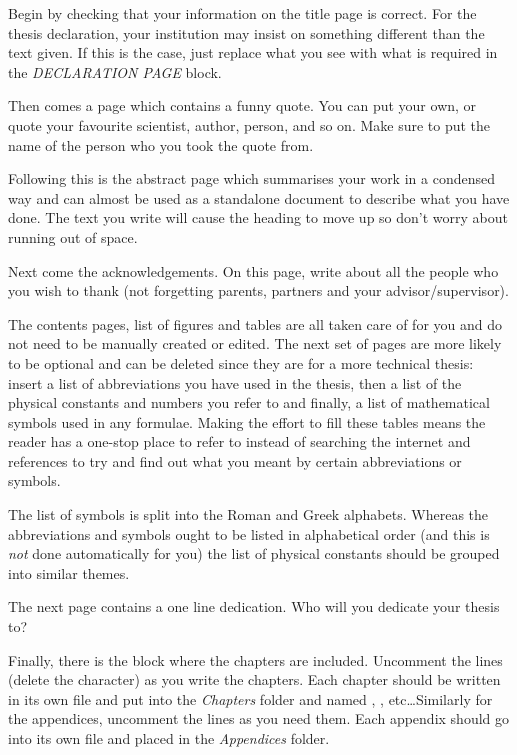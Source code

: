 Begin by checking that your information on the title page is correct. For the 
thesis declaration, your institution may insist on something different than the 
text given. If this is the case, just replace what you see with what is required 
in the \emph{DECLARATION PAGE} block.

Then comes a page which contains a funny quote. You can put your own, or quote 
your favourite scientist, author, person, and so on. Make sure to put the name 
of the person who you took the quote from.

Following this is the abstract page which summarises your work in a condensed 
way and can almost be used as a standalone document to describe what you have 
done. The text you write will cause the heading to move up so don't worry about 
running out of space.

Next come the acknowledgements. On this page, write about all the people who you 
wish to thank (not forgetting parents, partners and your advisor/supervisor).

The contents pages, list of figures and tables are all taken care of for you and 
do not need to be manually created or edited. The next set of pages are more 
likely to be optional and can be deleted since they are for a more technical 
thesis: insert a list of abbreviations you have used in the thesis, then a list 
of the physical constants and numbers you refer to and finally, a list of 
mathematical symbols used in any formulae. Making the effort to fill these 
tables means the reader has a one-stop place to refer to instead of searching 
the internet and references to try and find out what you meant by certain 
abbreviations or symbols.

The list of symbols is split into the Roman and Greek alphabets. Whereas the 
abbreviations and symbols ought to be listed in alphabetical order (and this 
is \emph{not} done automatically for you) the list of physical constants should 
be grouped into similar themes.

The next page contains a one line dedication. Who will you dedicate your thesis 
to?

Finally, there is the block where the chapters are included. Uncomment the lines 
(delete the \code{\%} character) as you write the chapters. Each chapter should 
be written in its own file and put into the \emph{Chapters} folder and named 
, , etc\ldots Similarly for the appendices, 
uncomment the lines as you need them. Each appendix should go into its own 
file and placed in the \emph{Appendices} folder.

